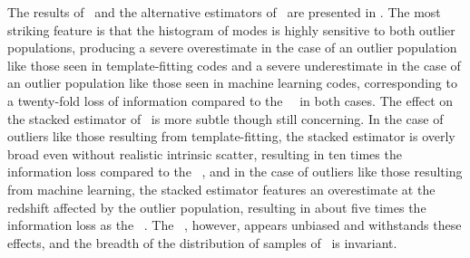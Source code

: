The results of \Chippr\ and the alternative estimators of \nz\ are presented in .
The most striking feature is that the histogram of modes is highly sensitive to both outlier populations, producing a severe overestimate in the case of an outlier population like those seen in template-fitting codes and a severe underestimate in the case of an outlier population like those seen in machine learning codes, corresponding to a twenty-fold loss of information compared to the \Chippr\ \mmle\ in both cases.
The effect on the stacked estimator of \nz\ is more subtle though still concerning.
In the case of outliers like those resulting from template-fitting, the stacked estimator is overly broad even without realistic intrinsic scatter, resulting in ten times the information loss compared to the \Chippr\ \mmle, and in the case of outliers like those resulting from machine learning, the stacked estimator features an overestimate at the redshift affected by the outlier population, resulting in about five times the information loss as the \Chippr\ \mmle.
The \Chippr\ \mmle, however, appears unbiased and withstands these effects, and the breadth of the distribution of samples of \nz\ is invariant.

